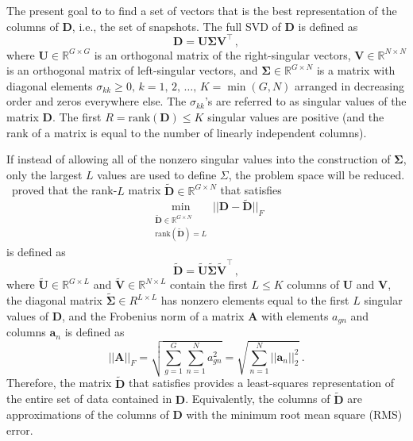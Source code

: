 The present goal to to find a set of vectors that is the best representation 
of the columns of $\mathbf{D}$, i.e., the set of snapshots.  The full SVD 
of $\mathbf{D}$ is defined as
\begin{equation}
    \mathbf{D} = \mathbf{U} \bm{\Sigma} \mathbf{V}^{\intercal} \, ,
    \label{eq:svd}
\end{equation}
where $\mathbf{U} \in \mathbb{R}^{G\times G}$ is an orthogonal matrix of the
right-singular vectors, $\mathbf{V} \in \mathbb{R}^{N\times N}$ is an 
orthogonal matrix of left-singular vectors, and  $\bm{\Sigma} \in 
\mathbb{R}^{G\times N}$ is a matrix with diagonal elements $\sigma_{kk} \geq 0, 
\,  k = 1,\,2,\, \ldots,\, K = \min(G, N)$ arranged in decreasing order and 
zeros everywhere else. The $\sigma_{kk}$'s are referred to as singular values 
of the matrix $\mathbf{D}$.  The first $R=\text{rank}(\mathbf{D})\leq K$ 
singular values are positive (and the rank of a matrix is equal to the number 
of linearly independent columns). 

If instead of allowing all of the nonzero singular values into the construction 
of $\mathbf{\Sigma}$, only the largest $L$ values are used to define $\Sigma$, 
the problem space will be reduced.  \, \citet{eckart1936approximation} proved that 
the rank-$L$ matrix $\tilde{\mathbf{D}} \in \mathbb{R}^{G\times N}$ that 
satisfies
\begin{equation}
    \min_{ \substack{\tilde{\mathbf{D}} \in \mathbb{R}^{G\times N} \\ \text{rank}(\tilde{\mathbf{D}})=L }} 
    || \mathbf{D} - \tilde{\mathbf{D}} ||_F 
    \label{eq:frobnorm}
\end{equation}
is defined as
\begin{equation}
    \tilde{\mathbf{D}} = \tilde{\mathbf{U}} \tilde{\bm{\Sigma}} \tilde{\mathbf{V}}^{\intercal} \, ,
    \label{eq:svdL}
\end{equation}
where $\tilde{\mathbf{U}} \in \mathbb{R}^{G\times L}$ and $\tilde{\mathbf{V}} 
\in \mathbb{R}^{N\times L}$ contain the first $L \leq K$ columns of $\mathbf{U}$ 
and $\mathbf{V}$, the diagonal matrix $\tilde{\bm{\Sigma}} \in R^{L\times L}$ 
has nonzero elements equal to the first $L$ singular values of $\mathbf{D}$, and 
the Frobenius norm of a matrix $\mathbf{A}$ with elements $a_{gn}$ and columns 
$\mathbf{a}_n$ is defined as 
\begin{equation}
    ||\mathbf{A}||_F = \sqrt{\sum^G_{g=1} \sum^N_{n=1} a_{gn}^2} = \sqrt{\sum_{n=1}^N ||\mathbf{a}_n||^2_2 }\, .
\end{equation}
Therefore, the matrix $\tilde{\mathbf{D}}$ that satisfies  
provides 
a least-squares representation of the entire set of data contained in 
$\mathbf{D}$.  Equivalently, the columns of $\tilde{\mathbf{D}}$ are 
approximations of the columns of $\mathbf{D}$ with the minimum root mean square 
(RMS) error. 

